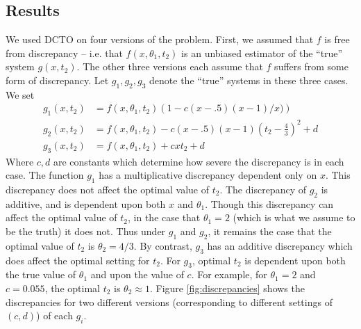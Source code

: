 \documentclass[12pt]{article}
\begin{document}
\subsection{Results}
% 
We used DCTO on four versions of the problem.
%
First, we assumed that $f$ is free from discrepancy -- i.e. that $f(x,\theta_1,t_2)$ is an unbiased estimator of the ``true'' system $g(x,t_2)$.
%
The other three versions each assume that $f$ suffers from some form of discrepancy.
%
Let $g_1,g_2,g_3$ denote the ``true'' systems in these three cases.
%
We set 
\begin{align*}
g_1(x,t_2) &= f(x,\theta_1,t_2) \left(1-c(x-.5)(x-1)/x) \right) \\
g_2(x,t_2)&= f(x,\theta_1,t_2) - c(x-.5)(x-1)\left(t_2-\frac43\right)^2 + d\\
g_3(x,t_2)&=f(x,\theta_1,t_2) + cxt_2+d
\end{align*}
%
Where $c,d$ are constants which determine how severe the discrepancy is in each case.
%
The function $g_1$ has a multiplicative discrepancy dependent only on $x$. 
%
This discrepancy does not affect the optimal value of $t_2$.  The discrepancy of $g_2$ is additive, and is dependent upon both $x$ and $\theta_1$. 
%
Though this discrepancy can affect the optimal value of $t_2$, in the case that $\theta_1=2$ (which is what we assume to be the truth) it does not.
%
Thus under $g_1$ and $g_2$, it remains the case that the optimal value of $t_2$ is $\theta_2=4/3$. 
%
By contrast, $g_3$ has an additive discrepancy which does affect the optimal setting for $t_2$. 
%
For $g_3$, optimal $t_2$ is dependent upon both the true value of $\theta_1$ and upon the value of $c$. 
%
For example, for $\theta_1=2$ and $c=0.055$, the optimal $t_2$ is $\theta_2\approx1$.
%
Figure \ref{fig:discrepancies} shows the discrepancies for two different versions (corresponding to different settings of $(c,d)$) of each $g_i$.
%
\end{document}
